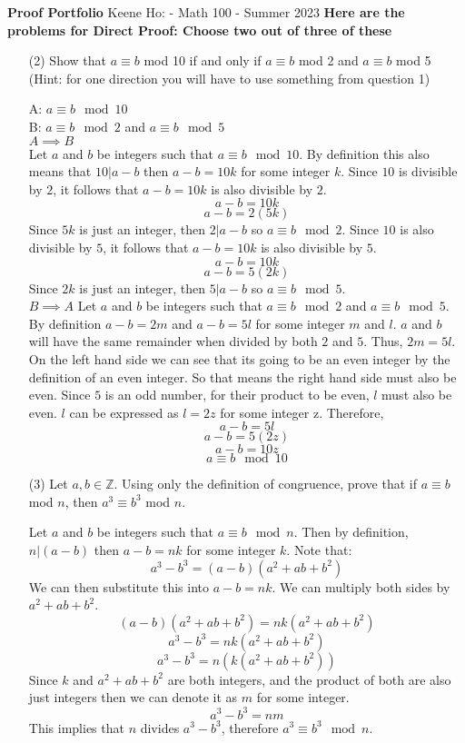 \documentclass[answers,12pt]{exam}
\newcommand{\br}{\hfill \break}
\newcommand{\Z}{\mathbb{Z}}
\newcommand{\bs}{\begin{solution}}
\newcommand{\es}{\end{solution}}
\begin{document}
\br
\textbf{Proof Portfolio}
\br
Keene Ho: - Math 100 - Summer 2023
\br\br
\textbf{Here are the problems for Direct Proof: Choose two out of three of these} %
\begin{enumerate}
    \item [(2)] Show that \(a \equiv b \) mod 10 if and only if \(a \equiv b \) mod 2 and \(a \equiv b \) mod 5 (Hint: for one direction you will have to use something from question 1)
    \bs
    A: \(a \equiv b \mod 10\)\\
    B: \(a \equiv b \mod 2\) and \(a \equiv b \mod 5\)\\
    \(A \implies B\)\\
    Let \(a\) and \(b\) be integers such that \(a \equiv b\mod 10\). By definition this also means that \(10 | a - b\) then \(a - b = 10k\) for some integer \(k\). Since \(10\) is divisible by \(2\), it follows that \(a - b = 10k\) is also divisible by \(2\).
    \[a - b = 10k\]
    \[a - b = 2(5k)\]
    Since \(5k\) is just an integer, then \(2 | a - b\) so \(a \equiv b \mod 2\). Since \(10\) is also divisible by \(5\), it follows that \(a - b = 10k\) is also divisible by \(5\).
    \[a - b = 10k\]
    \[a - b = 5(2k)\]
    Since \(2k\) is just an integer, then \(5 | a - b\) so \(a \equiv b \mod 5\).\\
    \(B \implies A\)
    Let \(a\) and \(b\) be integers such that \(a \equiv b \mod 2\) and \(a \equiv b \mod 5\). By definition \(a - b = 2m\) and \(a - b = 5l\) for some integer \(m\) and \(l\). \(a\) and \(b\) will have the same remainder when divided by both \(2\) and \(5\). Thus, \(2m = 5l\). On the left hand side we can see that its going to be an even integer by the definition of an even integer. So that means the right hand side must also be even. Since \(5\) is an odd number, for their product to be even, \(l\) must also be even. \(l\) can be expressed as \(l = 2z\) for some integer z. Therefore,
    \[a - b = 5l\]
    \[a - b = 5(2z)\]
    \[a - b = 10z\]
    \[a \equiv b \mod 10\]
    \es
    
    
    \item [(3)] Let \(a, b \in \Z\). Using only the definition of congruence, prove that if \(a \equiv b \) mod \(n\), then \(a^3 \equiv b^3 \) mod \(n\). 
    \bs
    Let \(a\) and \(b\) be integers such that \(a \equiv b \mod n\). Then by definition, \(n | (a - b)\) then \(a - b = nk\) for some integer \(k\). Note that:
    \[a^3-b^3 = (a-b)(a^2+ab+b^2)\]
    We can then substitute this into \(a - b = nk\). We can multiply both sides by \(a^2+ab+b^2\).
    \[(a-b)(a^2+ab+b^2) = nk(a^2+ab+b^2)\]
    \[a^3-b^3=nk(a^2+ab+b^2)\]
    \[a^3-b^3=n(k(a^2+ab+b^2))\]
    Since \(k\) and \(a^2+ab+b^2\) are both integers, and the product of both are also just integers then we can denote it as \(m\) for some integer.
    \[a^3-b^3 = nm\]
    This implies that \(n\) divides \(a^3-b^3\), therefore \(a^3 \equiv b^3 \mod n\).
    \es
\end{enumerate}
\end{document}
